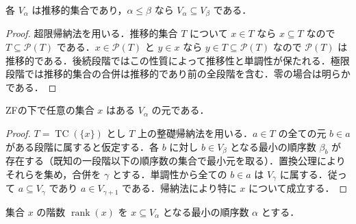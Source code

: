 \begin{prop}[累積階層の推移性と単調性]
各 $V_\alpha$ は推移的集合であり，$\alpha\leq\beta$ なら $V_\alpha\subseteq V_\beta$ である．
\end{prop}
\begin{proof}
超限帰納法を用いる．推移的集合 $T$ について $x\in T$ なら $x\subseteq T$ なので $T\subseteq\mathcal P(T)$ である．$x\in\mathcal P(T)$ と $y\in x$ なら $y\in T\subseteq\mathcal P(T)$ なので $\mathcal P(T)$ は推移的である．後続段階ではこの性質によって推移性と単調性が保たれる．極限段階では推移的集合の合併は推移的であり前の全段階を含む．零の場合は明らかである．
\end{proof}
\begin{prop}[累積階層による全ての集合の被覆]
ZFの下で任意の集合 $x$ はある $V_\alpha$ の元である．
\end{prop}
\begin{proof}
$T=\operatorname{TC}(\{x\})$ とし $T$ 上の整礎帰納法を用いる．$a\in T$ の全ての元 $b\in a$ がある段階に属すると仮定する．各 $b$ に対し $b\in V_\beta$ となる最小の順序数 $\beta_b$ が存在する（既知の一段階以下の順序数の集合で最小元を取る）．置換公理によりそれらを集め，合併を $\gamma$ とする．単調性から全ての $b\in a$ は $V_\gamma$ に属する．従って $a\subseteq V_\gamma$ であり $a\in V_{\gamma+1}$ である．帰納法により特に $x$ について成立する．
\end{proof}
\begin{defn}[集合の階数]
集合 $x$ の階数 $\operatorname{rank}(x)$ を $x\subseteq V_\alpha$ となる最小の順序数 $\alpha$ とする．
\end{defn}

